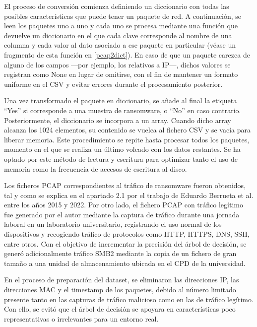 El proceso de conversión comienza definiendo un diccionario con todas las posibles características que puede tener un paquete de red. A continuación, se leen los paquetes uno a uno y cada uno se procesa mediante una función que devuelve un diccionario en el que cada clave corresponde al nombre de una columna y cada valor al dato asociado a ese paquete en particular (véase un fragmento de esta función en \ref{pcap2dict}). En caso de que un paquete carezca de alguno de los campos —por ejemplo, los relativos a IP—, dichos valores se registran como None en lugar de omitirse, con el fin de mantener un formato uniforme en el CSV y evitar errores durante el procesamiento posterior.

Una vez transformado el paquete en diccionario, se añade al final la etiqueta ``Yes'' si corresponde a una muestra de ransomware, o ``No'' en caso contrario. Posteriormente, el diccionario se incorpora a un array. Cuando dicho array alcanza los 1024 elementos, su contenido se vuelca al fichero CSV y se vacía para liberar memoria. Este procedimiento se repite hasta procesar todos los paquetes, momento en el que se realiza un último volcado con los datos restantes. Se ha optado por este método de lectura y escritura para optimizar tanto el uso de memoria como la frecuencia de accesos de escritura al disco.

Los ficheros PCAP correspondientes al tráfico de ransomware fueron obtenidos, tal y como se explica en el apartado 2.1 por el trabajo de Eduardo Berrueta et al. entre los años 2015 y 2022\cite{qnyn-q136-20}. Por otro lado, el fichero PCAP con tráfico legítimo fue generado por el autor mediante la captura de tráfico durante una jornada laboral en un laboratorio universitario, registrando el uso normal de los dispositivos y recogiendo tráfico de protocolos como HTTP, HTTPS, DNS, SSH, entre otros. Con el objetivo de incrementar la precisión del árbol de decisión, se generó adicionalmente tráfico SMB2 mediante la copia de un fichero de gran tamaño a una unidad de almacenamiento ubicada en el CPD de la universidad.

En el proceso de preparación del dataset, se eliminaron las direcciones IP, las direcciones MAC y el timestamp de los paquetes, debido al número limitado presente tanto en las capturas de tráfico malicioso como en las de tráfico legítimo. Con ello, se evitó que el árbol de decisión se apoyara en características poco representativas o irrelevantes para un entorno real. 



